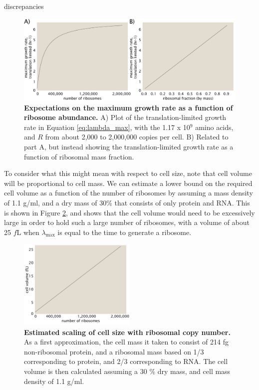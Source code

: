 discrepancies \documentclass[11pt, letterpaper]{article}
\begin{document}
\begin{figure}[H]
		\centering
    \includegraphics[width=1\textwidth]{../../code/figures/SI/estimates_translation_toy_1.pdf}
  \caption{{\bf Expectations on the maximum growth rate as a function of ribosome abundance.}
	 	A) Plot of the translation-limited growth rate in Equation
	 	\ref{eq:lambda_max}, with the 1.17 x 10$^9$ amino acids, and $R$ from about
	 	2,000 to 2,000,000 copies per cell. B) Related to part A, but instead
	 	showing the translation-limited growth rate as a function of ribosomal mass
	 	fraction.}
  \label{fig:estimates_translation_toy_1}
\end{figure}

To consider what this might mean with respect to cell size, note that cell
volume will be proportional to cell mass. We can estimate a lower bound on the
required cell volume as a function of the number of ribosomes by assuming a mass
density of 1.1 g/ml, and a dry mass of 30\% that consists of only protein and
RNA.  This is shown in Figure \ref{fig:estimates_translation_volume}, and shows
that the cell volume would need to be excessively large in order to hold such a
large number of ribosomes, with a volume of about 25 $f$L when $\lambda_{\text{max}}$ is equal
to the time to generate a ribosome.

\begin{figure}[H]
		\centering
    \includegraphics[width=0.5\textwidth]{../../code/figures/SI/estimates_translation_volume.pdf}
  \caption{{\bf Estimated scaling of cell size with ribosomal copy number.} As a first approximation,
	the cell mass it taken to consist of 214 fg non-ribosomal protein, and a ribosomal mass based
	on 1/3 corresponding to protein, and 2/3 corresponding to RNA. The cell volume is then calculated assuming
	a 30 \% dry mass, and cell mass density of 1.1 g/ml. }
  \label{fig:estimates_translation_volume}
\end{figure}
\end{document}
